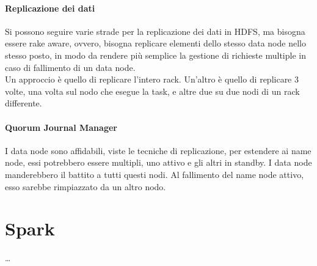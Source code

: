 \documentclass[a4paper]{article}
\begin{document}
\paragraph{Replicazione dei dati}
Si possono seguire varie strade per la replicazione dei dati in HDFS, ma bisogna 
essere rake aware, ovvero, bisogna replicare elementi dello stesso data node nello
stesso posto, in modo da rendere più semplice la gestione di richieste multiple
in caso di fallimento di un data node.\\
Un approccio è quello di replicare l'intero rack. Un'altro è quello di replicare 3 
volte, una volta sul nodo che esegue la task, e altre due su due nodi di un rack 
differente.

\paragraph{Quorum Journal Manager}
I data node sono affidabili, viste le tecniche di replicazione, per estendere
ai name node, essi potrebbero essere multipli, uno attivo e gli altri in standby.
I data node manderebbero il battito a tutti questi nodi. Al fallimento del name node 
attivo, esso sarebbe rimpiazzato da un altro nodo.

\section{Spark}
\dots






\end{document}
